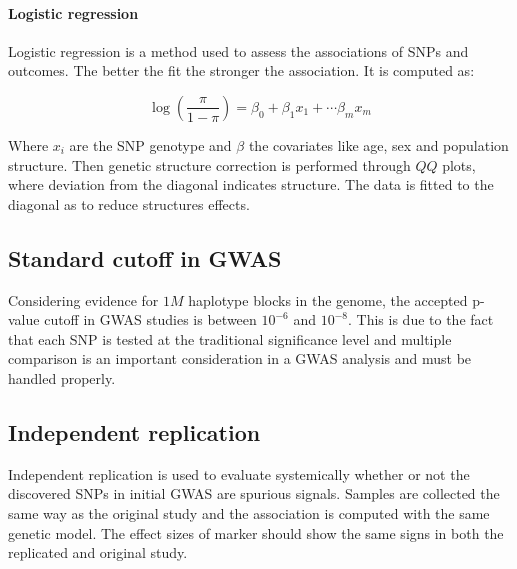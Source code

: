 			\paragraph{Logistic regression}
			Logistic regression is a method used to assess the associations of SNPs and outcomes.
			The better the fit the stronger the association.
			It is computed as:

			$$\log(\frac{\pi}{1-\pi}) = \beta_0+\beta_1x_1+\cdots \beta_mx_m$$

			Where $x_i$ are the SNP genotype and $\beta$ the covariates like age, sex and population structure.
			Then genetic structure correction is performed through $QQ$ plots, where deviation from the diagonal indicates structure.
			The data is fitted to the diagonal as to reduce structures effects.

	\subsection{Standard cutoff in GWAS}
	Considering evidence for $1M$ haplotype blocks in the genome, the accepted p-value cutoff in GWAS studies is between $10^{-6}$ and $10^{-8}$.
	This is due to the fact that each SNP is tested at the traditional significance level and multiple comparison is an important consideration in a GWAS analysis and must be handled properly.

	\subsection{Independent replication}
	Independent replication is used to evaluate systemically whether or not the discovered SNPs in initial GWAS are spurious signals.
	Samples are collected the same way as the original study and the association is computed with the same genetic model.
	The effect sizes of marker should show the same signs in both the replicated and original study.
